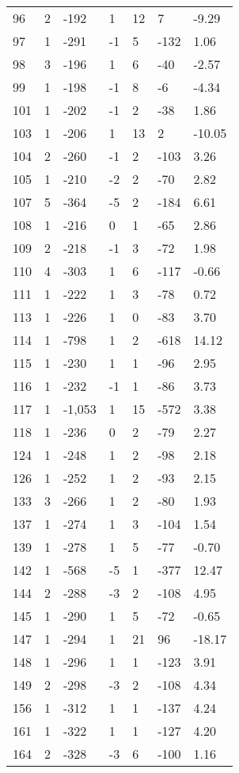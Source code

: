 \begin{appendices}
\begin{longtable}[c]{@{}lllllll@{}}
96 & 2 & -192 & 1 & 12 & 7 & -9.29 \\
97 & 1 & -291 & -1 & 5 & -132 & 1.06 \\
98 & 3 & -196 & 1 & 6 & -40 & -2.57 \\
99 & 1 & -198 & -1 & 8 & -6 & -4.34 \\
101 & 1 & -202 & -1 & 2 & -38 & 1.86 \\
103 & 1 & -206 & 1 & 13 & 2 & -10.05 \\
104 & 2 & -260 & -1 & 2 & -103 & 3.26 \\
105 & 1 & -210 & -2 & 2 & -70 & 2.82 \\
107 & 5 & -364 & -5 & 2 & -184 & 6.61 \\
108 & 1 & -216 & 0 & 1 & -65 & 2.86 \\
109 & 2 & -218 & -1 & 3 & -72 & 1.98 \\
110 & 4 & -303 & 1 & 6 & -117 & -0.66 \\
111 & 1 & -222 & 1 & 3 & -78 & 0.72 \\
113 & 1 & -226 & 1 & 0 & -83 & 3.70 \\
114 & 1 & -798 & 1 & 2 & -618 & 14.12 \\
115 & 1 & -230 & 1 & 1 & -96 & 2.95 \\
116 & 1 & -232 & -1 & 1 & -86 & 3.73 \\
117 & 1 & -1,053 & 1 & 15 & -572 & 3.38 \\
118 & 1 & -236 & 0 & 2 & -79 & 2.27 \\
124 & 1 & -248 & 1 & 2 & -98 & 2.18 \\
126 & 1 & -252 & 1 & 2 & -93 & 2.15 \\
133 & 3 & -266 & 1 & 2 & -80 & 1.93 \\
137 & 1 & -274 & 1 & 3 & -104 & 1.54 \\
139 & 1 & -278 & 1 & 5 & -77 & -0.70 \\
142 & 1 & -568 & -5 & 1 & -377 & 12.47 \\
144 & 2 & -288 & -3 & 2 & -108 & 4.95 \\
145 & 1 & -290 & 1 & 5 & -72 & -0.65 \\
147 & 1 & -294 & 1 & 21 & 96 & -18.17 \\
148 & 1 & -296 & 1 & 1 & -123 & 3.91 \\
149 & 2 & -298 & -3 & 2 & -108 & 4.34 \\
156 & 1 & -312 & 1 & 1 & -137 & 4.24 \\
161 & 1 & -322 & 1 & 1 & -127 & 4.20 \\
164 & 2 & -328 & -3 & 6 & -100 & 1.16 \\

\end{longtable}
\end{appendices}
